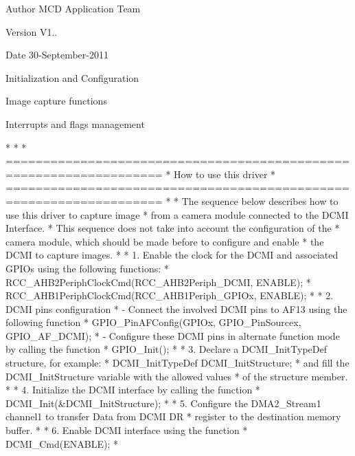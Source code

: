 \begin{DoxyAuthor}{Author}
M\+CD Application Team 
\end{DoxyAuthor}
\begin{DoxyVersion}{Version}
V1.. 
\end{DoxyVersion}
\begin{DoxyDate}{Date}
30-\/\+September-\/2011
\begin{DoxyItemize}
\item Initialization and Configuration
\item Image capture functions
\item Interrupts and flags management
\end{DoxyItemize}
\end{DoxyDate}
\begin{DoxyVerb}*  
*        
*          ===================================================================
*                                 How to use this driver
*          ===================================================================  
*         
*         The sequence below describes how to use this driver to capture image
*         from a camera module connected to the DCMI Interface.
*         This sequence does not take into account the configuration of the  
*         camera module, which should be made before to configure and enable
*         the DCMI to capture images.
*           
*          1. Enable the clock for the DCMI and associated GPIOs using the following functions:
*                 RCC_AHB2PeriphClockCmd(RCC_AHB2Periph_DCMI, ENABLE);
*                 RCC_AHB1PeriphClockCmd(RCC_AHB1Periph_GPIOx, ENABLE);
*
*          2. DCMI pins configuration 
*             - Connect the involved DCMI pins to AF13 using the following function 
*                 GPIO_PinAFConfig(GPIOx, GPIO_PinSourcex, GPIO_AF_DCMI); 
*             - Configure these DCMI pins in alternate function mode by calling the function
*                 GPIO_Init();
*    
*          3. Declare a DCMI_InitTypeDef structure, for example:
*                 DCMI_InitTypeDef  DCMI_InitStructure;
*             and fill the DCMI_InitStructure variable with the allowed values
*             of the structure member.
*  
*          4. Initialize the DCMI interface by calling the function
*                 DCMI_Init(&DCMI_InitStructure); 
*  
*          5. Configure the DMA2_Stream1 channel1 to transfer Data from DCMI DR
*             register to the destination memory buffer.
*  
*          6. Enable DCMI interface using the function
*                 DCMI_Cmd(ENABLE);
*                 

\end{DoxyVerb}
